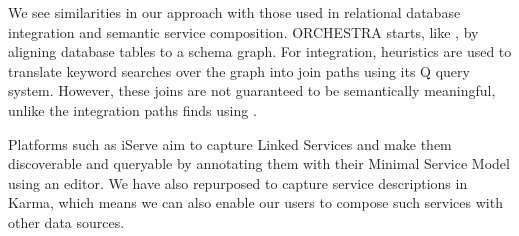 We see similarities in our approach with those used in relational database integration and semantic service composition.  
ORCHESTRA\cite{ives2008orchestra} starts, like \rtworml, by aligning database tables to a schema graph.  
For integration, heuristics are used to translate keyword searches over the graph into join paths using its Q query system. 
However, these joins are not guaranteed to be semantically meaningful, unlike the integration paths \karma finds using \rtworml.

Platforms such as iServe\cite{pedrinaci2010iserve} aim to capture Linked Services and make them discoverable and queryable by annotating them with their Minimal Service Model using an editor.
We have also repurposed \rtworml to capture service descriptions in Karma\cite{taheriyan12:lapis}, which means we can also enable our users to compose such services with other data sources. 

